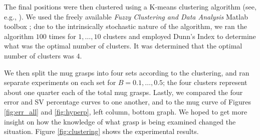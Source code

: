 The final positions were then clustered using a K-means clustering
algorithm (see, e.g., \cite{macqueen}). We used the freely available
\emph{Fuzzy Clustering and Data Analysis} Matlab toolbox
\cite{fctBalasko1,fctBalasko2}; due to the intrinsically stochastic
nature of the algorithm, we ran the algorithm $100$ times for
$1,\ldots,10$ clusters and employed Dunn's Index \cite{dunn} to
determine what was the optimal number of clusters. It was determined
that the optimal number of clusters was $4$.


We then split the mug grasps into four sets according to the
clustering, and ran separate experiments on each set for
$B=0.1,\ldots,0.5$; the four clusters represent about one quarter each
of the total mug grasps. Lastly, we compared the four error and SV
percentage curves to one another, and to the mug curve of Figures
\ref{fig:err_all} and \ref{fig:hyperp}, left column, bottom graph. We
hoped to get more insight on how the knowledge of what grasp is being
examined changed the situation. Figure \ref{fig:clustering} shows the
experimental results.

